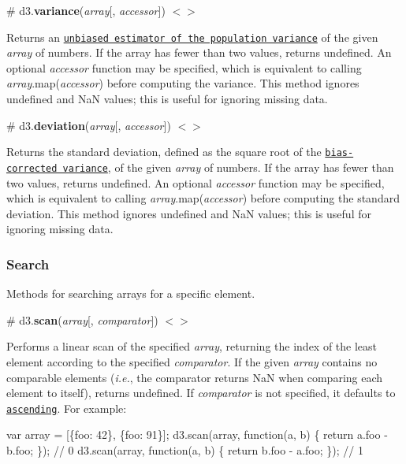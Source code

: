 \label{_variance}%
\# d3.{\bfseries variance}({\itshape array}\mbox{[}, {\itshape accessor}\mbox{]}) \href{https://github.com/d3/d3-array/blob/master/src/variance.js}{\tt $<$$>$}

Returns an \href{http://mathworld.wolfram.com/SampleVariance.html}{\tt unbiased estimator of the population variance} of the given {\itshape array} of numbers. If the array has fewer than two values, returns undefined. An optional {\itshape accessor} function may be specified, which is equivalent to calling {\itshape array}.map({\itshape accessor}) before computing the variance. This method ignores undefined and NaN values; this is useful for ignoring missing data.

\label{_deviation}%
\# d3.{\bfseries deviation}({\itshape array}\mbox{[}, {\itshape accessor}\mbox{]}) \href{https://github.com/d3/d3-array/blob/master/src/deviation.js}{\tt $<$$>$}

Returns the standard deviation, defined as the square root of the \href{#variance}{\tt bias-\/corrected variance}, of the given {\itshape array} of numbers. If the array has fewer than two values, returns undefined. An optional {\itshape accessor} function may be specified, which is equivalent to calling {\itshape array}.map({\itshape accessor}) before computing the standard deviation. This method ignores undefined and NaN values; this is useful for ignoring missing data.

\subsubsection*{Search}

Methods for searching arrays for a specific element.

\label{_scan}%
\# d3.{\bfseries scan}({\itshape array}\mbox{[}, {\itshape comparator}\mbox{]}) \href{https://github.com/d3/d3-array/blob/master/src/scan.js}{\tt $<$$>$}

Performs a linear scan of the specified {\itshape array}, returning the index of the least element according to the specified {\itshape comparator}. If the given {\itshape array} contains no comparable elements ({\itshape i.\+e.}, the comparator returns NaN when comparing each element to itself), returns undefined. If {\itshape comparator} is not specified, it defaults to \href{#ascending}{\tt ascending}. For example\+:


\begin{DoxyCode}
var array = [\{foo: 42\}, \{foo: 91\}];
d3.scan(array, function(a, b) \{ return a.foo - b.foo; \}); // 0
d3.scan(array, function(a, b) \{ return b.foo - a.foo; \}); // 1
\end{DoxyCode}


